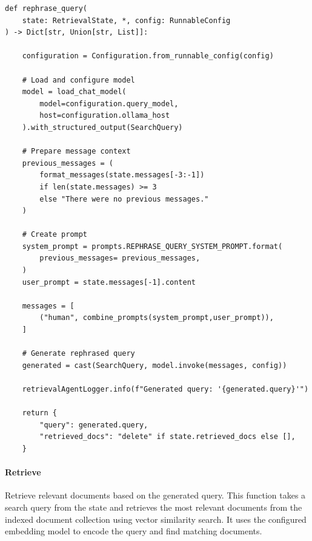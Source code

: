 \documentclass[11pt,a4paper]{report}
\begin{document}
\begin{lstlisting}[caption={Rephrase query node}]
def rephrase_query(
    state: RetrievalState, *, config: RunnableConfig
) -> Dict[str, Union[str, List]]:

    configuration = Configuration.from_runnable_config(config)
    
    # Load and configure model
    model = load_chat_model(
        model=configuration.query_model, 
        host=configuration.ollama_host
    ).with_structured_output(SearchQuery)
    
    # Prepare message context
    previous_messages = (
        format_messages(state.messages[-3:-1]) 
        if len(state.messages) >= 3 
        else "There were no previous messages."
    )
    
    # Create prompt
    system_prompt = prompts.REPHRASE_QUERY_SYSTEM_PROMPT.format(
        previous_messages= previous_messages,
    )
    user_prompt = state.messages[-1].content
    
    messages = [
        ("human", combine_prompts(system_prompt,user_prompt)),
    ]
    
    # Generate rephrased query
    generated = cast(SearchQuery, model.invoke(messages, config))
    
    retrievalAgentLogger.info(f"Generated query: '{generated.query}'")
    
    return {
        "query": generated.query,
        "retrieved_docs": "delete" if state.retrieved_docs else [],
    }
\end{lstlisting}

\paragraph{Retrieve}

Retrieve relevant documents based on the generated query. This function takes a search query from the state and retrieves the most relevant documents from the indexed document collection using vector similarity search. It uses the configured embedding model to encode the query and find matching documents.
\end{document}
